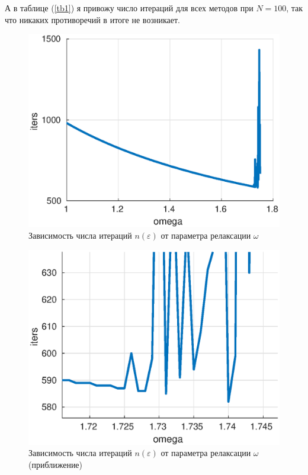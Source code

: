 \documentclass[12pt]{article}
\begin{document}
А в таблице (\ref{tb1}) я привожу число итераций для всех методов при $N = 100$, так что никаких противоречий в итоге не возникает.



\begin{figure}[H]
\centerline{\includegraphics[scale = 0.8]{sor.eps}}
\caption{Зависимость числа итераций $n(\varepsilon)$ от параметра релаксации $\omega$}
\label{fig5}
\end{figure} 

\begin{figure}[H]
\centerline{\includegraphics[scale = 0.8]{sor2.eps}}
\caption{Зависимость числа итераций $n(\varepsilon)$ от параметра релаксации $\omega$ (приближение)}
\label{fig2}
\end{figure} 
\end{document}

